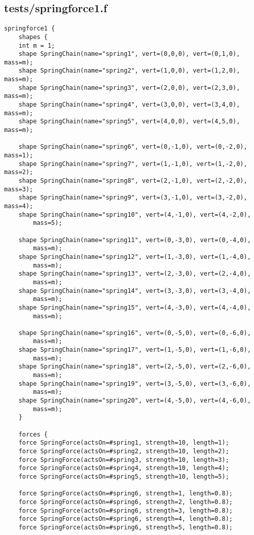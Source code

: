 \subsection*{tests/springforce1.f}
\begin{lstlisting}
springforce1 {
    shapes {
	int m = 1;
	shape SpringChain(name="spring1", vert=(0,0,0), vert=(0,1,0), mass=m);
	shape SpringChain(name="spring2", vert=(1,0,0), vert=(1,2,0), mass=m);
	shape SpringChain(name="spring3", vert=(2,0,0), vert=(2,3,0), mass=m);
	shape SpringChain(name="spring4", vert=(3,0,0), vert=(3,4,0), mass=m);
	shape SpringChain(name="spring5", vert=(4,0,0), vert=(4,5,0), mass=m);

	shape SpringChain(name="spring6", vert=(0,-1,0), vert=(0,-2,0), mass=1);
	shape SpringChain(name="spring7", vert=(1,-1,0), vert=(1,-2,0), mass=2);
	shape SpringChain(name="spring8", vert=(2,-1,0), vert=(2,-2,0), mass=3);
	shape SpringChain(name="spring9", vert=(3,-1,0), vert=(3,-2,0), mass=4);
	shape SpringChain(name="spring10", vert=(4,-1,0), vert=(4,-2,0),
		mass=5);

	shape SpringChain(name="spring11", vert=(0,-3,0), vert=(0,-4,0),
		mass=m);
	shape SpringChain(name="spring12", vert=(1,-3,0), vert=(1,-4,0),
		mass=m);
	shape SpringChain(name="spring13", vert=(2,-3,0), vert=(2,-4,0),
		mass=m);
	shape SpringChain(name="spring14", vert=(3,-3,0), vert=(3,-4,0),
		mass=m);
	shape SpringChain(name="spring15", vert=(4,-3,0), vert=(4,-4,0),
		mass=m);

	shape SpringChain(name="spring16", vert=(0,-5,0), vert=(0,-6,0),
		mass=m);
	shape SpringChain(name="spring17", vert=(1,-5,0), vert=(1,-6,0),
		mass=m);
	shape SpringChain(name="spring18", vert=(2,-5,0), vert=(2,-6,0),
		mass=m);
	shape SpringChain(name="spring19", vert=(3,-5,0), vert=(3,-6,0),
		mass=m);
	shape SpringChain(name="spring20", vert=(4,-5,0), vert=(4,-6,0),
		mass=m);
    }

    forces {
	force SpringForce(actsOn=#spring1, strength=10, length=1);
	force SpringForce(actsOn=#spring2, strength=10, length=2);
	force SpringForce(actsOn=#spring3, strength=10, length=3);
	force SpringForce(actsOn=#spring4, strength=10, length=4);
	force SpringForce(actsOn=#spring5, strength=10, length=5);

	force SpringForce(actsOn=#spring6, strength=1, length=0.8);
	force SpringForce(actsOn=#spring6, strength=2, length=0.8);
	force SpringForce(actsOn=#spring6, strength=3, length=0.8);
	force SpringForce(actsOn=#spring6, strength=4, length=0.8);
	force SpringForce(actsOn=#spring6, strength=5, length=0.8);


\end{lstlisting}
